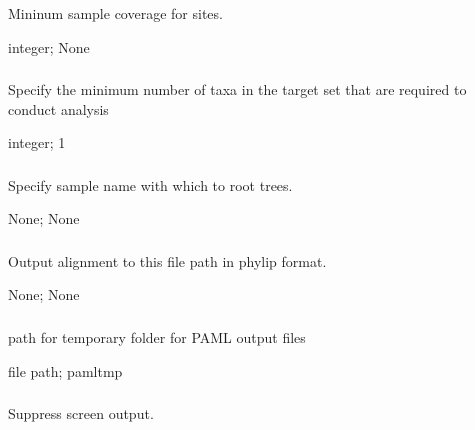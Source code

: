 \documentclass[letterpaper,11pt,english]{sphinxmanual}
\begin{document}
\subsubsection{}
\label{\detokenize{prog_desc:id105}}
 Mininum sample coverage for sites.

 integer;  None


\subsubsection{}
\label{\detokenize{prog_desc:num-target-species-targetspec}}
 Specify the minimum number of taxa in the target set that are required to conduct analysis

 integer;  1


\subsubsection{}
\label{\detokenize{prog_desc:outgroup}}
 Specify sample name with which to root trees.

 None;  None


\subsubsection{}
\label{\detokenize{prog_desc:output-align-outputalign}}
 Output alignment to this file path in phylip format.

 None;  None


\subsubsection{}
\label{\detokenize{prog_desc:paml-tmp-pamltmp}}
 path for temporary folder for PAML output files

 file path;  pamltmp


\subsubsection{}
\label{\detokenize{prog_desc:id106}}
 Suppress screen output.
\end{document}
